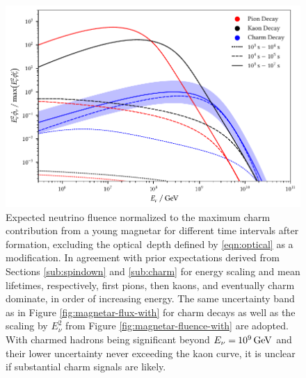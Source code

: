 \begin{figure}[H]
	\centering
	\includegraphics{../plots/build/magnetar_integrated_neutrino_spectrum_without.pdf}
	\caption[Magnetar $\nu \kern+0.5pt$ fluence compared to $c$ decay without optical depth.]
			{Expected neutrino fluence normalized to the maximum charm contribution from a young magnetar for different time
			 intervals after formation, excluding the optical~depth defined by \eqref{eqn:optical} as a modification.
			 In agreement with prior expectations derived from Sections \ref{sub:spindown} and \ref{sub:charm} for energy
			 scaling and mean lifetimes, respectively, first pions, then kaons, and eventually charm dominate, in order
			 of increasing energy. The same uncertainty band as in Figure \ref{fig:magnetar-flux-with}
			 for charm decays as well as the scaling by $E_\nu^2$ from Figure \ref{fig:magnetar-fluence-with} are adopted.
			 With charmed hadrons being significant beyond $E_\nu = \kern-0.5pt \qty{e9}{\giga\electronvolt}$ and their lower
			 uncertainty never exceeding the kaon curve, it is unclear if substantial charm signals are likely.}
	\label{fig:magnetar-fluence-without}
\end{figure}
